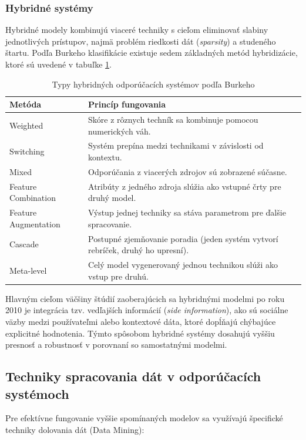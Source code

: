 \subsubsection{Hybridné systémy}
Hybridné modely kombinujú viaceré techniky s cieľom eliminovať slabiny jednotlivých prístupov, najmä problém riedkosti dát (\textit{sparsity}) a studeného štartu. Podľa Burkeho klasifikácie \cite{electronics11010141} existuje sedem základných metód hybridizácie, ktoré sú uvedené v tabuľke \ref{tab:hybrid_types}.
\begin{table}[ht]
\centering
\caption{Typy hybridných odporúčacích systémov podľa Burkeho \cite{electronics11010141}}
\label{tab:hybrid_types}
\begin{tabular}{|l|p{9cm}|}
\hline
\textbf{Metóda} & \textbf{Princíp fungovania} \\ \hline
Weighted & Skóre z rôznych techník sa kombinuje pomocou numerických váh. \\ \hline
Switching & Systém prepína medzi technikami v závislosti od kontextu. \\ \hline
Mixed & Odporúčania z viacerých zdrojov sú zobrazené súčasne. \\ \hline
Feature Combination & Atribúty z jedného zdroja slúžia ako vstupné črty pre druhý model. \\ \hline
Feature Augmentation & Výstup jednej techniky sa stáva parametrom pre ďalšie spracovanie. \\ \hline
Cascade & Postupné zjemňovanie poradia (jeden systém vytvorí rebríček, druhý ho upresní). \\ \hline
Meta-level & Celý model vygenerovaný jednou technikou slúži ako vstup pre druhú. \\ \hline
\end{tabular}
\end{table}
Hlavným cieľom väčšiny štúdií zaoberajúcich sa hybridnými modelmi po roku 2010 je integrácia tzv. vedľajších informácií (\textit{side information}), ako sú sociálne väzby medzi používateľmi alebo kontextové dáta, ktoré dopĺňajú chýbajúce explicitné hodnotenia. Týmto spôsobom hybridné systémy dosahujú vyššiu presnosť a robustnosť v porovnaní so samostatnými modelmi.

\subsection{Techniky spracovania dát v odporúčacích systémoch}
Pre efektívne fungovanie vyššie spomínaných modelov sa využívajú špecifické techniky dolovania dát (Data Mining):

